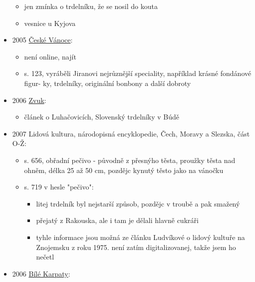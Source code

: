 \begin{itemize}
  \begin{itemize}
  \tightlist
  \item
    jen zmínka o trdelníku, že se nosil do kouta
  \item
    vesnice u Kyjova
  \end{itemize}
\item
  2005
  \href{https://ceskadigitalniknihovna.cz/uuid/uuid:12d02530-5e00-11e5-bf4b-005056827e51}{České
  Vánoce}:

  \begin{itemize}
  \tightlist
  \item
    není online, najít
  \item
    s. 123, vyráběli Jiranovi nejrůznější speciality, například krásné
    fondánové figur- ky, trdelníky, originální bonbony a další dobroty
  \end{itemize}
\item
  2006
  \href{https://ceskadigitalniknihovna.cz/uuid/uuid:d3bddf00-5ca4-11eb-a728-5ef3fc9bb22f}{Zvuk}:

  \begin{itemize}
  \tightlist
  \item
    článek o Luhačovicích, Slovenský trdelníky v Búdě
  \end{itemize}
\item
  2007 Lidová kultura, národopisná encyklopedie, Čech, Moravy a Slezska,
  část O-Ž:

  \begin{itemize}
  \tightlist
  \item
    s. 656, obřadní pečivo - původně z přesnýho těsta, proužky těsta nad
    ohněm, délka 25 až 50 cm, pozdějc kynutý těsto jako na vánočku
  \item
    s. 719 v hesle "pečivo":

    \begin{itemize}
    \tightlist
    \item
      litej trdelník byl nejstarší způsob, pozdějc v troubě a pak
      smažený
    \item
      přejatý z Rakouska, ale i tam je dělali hlavně cukráři
    \item
      tyhle informace jsou možná ze článku Ludvíkové o lidový kultuře na
      Znojemsku z roku 1975. není zatím digitalizovanej, takže jsem ho
      nečetl
    \end{itemize}
  \end{itemize}
\item
  2006
  \href{https://ceskadigitalniknihovna.cz/uuid/uuid:1b16fb51-6afc-11e2-b4a8-001018b5eb5c}{Bílé
  Karpaty}:


\end{itemize}
